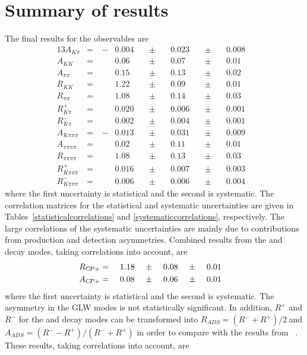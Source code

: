 \section{Summary of results}
\label{sec:cpfit:summary}

The final results for the \CP observables are  
\begin{alignat*}{13}
A_{K\pi} &= &\ -&0.004&\ &\pm&\ &0.023&\ &\pm&\ &0.008& \\
A_{KK} &= &&0.06&\ &\pm&\ &0.07&\ &\pm&\ &0.01& \\
A_{\pi\pi} &= &&0.15&\ &\pm&\ &0.13&\ &\pm&\ &0.02& \\
R_{KK} &= &&1.22&\ &\pm&\ &0.09&\ &\pm&\ &0.01& \\
R_{\pi\pi} &= &&1.08&\ &\pm&\ &0.14&\ &\pm&\ &0.03& \\
R^+_{K\pi} &= &&0.020&\ &\pm&\ &0.006&\ &\pm&\ &0.001& \\ 
R^-_{K\pi} &= &&0.002&\ &\pm&\ &0.004&\ &\pm&\ &0.001& \\
A_{K\pi\pi\pi} &= &\ -&0.013&\ &\pm&\ &0.031&\ &\pm&\ &0.009& \\
A_{\pi\pi\pi\pi} &= &&0.02&\ &\pm&\ &0.11&\ &\pm&\ &0.01& \\
R_{\pi\pi\pi\pi} &= &&1.08&\ &\pm&\ &0.13&\ &\pm&\ &0.03& \\
R^+_{K\pi\pi\pi} &= &&0.016&\ &\pm&\ &0.007&\ &\pm&\ &0.003& \\ 
R^-_{K\pi\pi\pi} &= &&0.006&\ &\pm&\ &0.006&\ &\pm&\ &0.004&
\end{alignat*}
where the first uncertainty is statistical and the second is systematic. The correlation matrices for the statistical and systematic uncertainties are given in Tables~\ref{statisticalcorrelations} and \ref{systematiccorrelations}, respectively. The large correlations of the systematic uncertainties are mainly due to contributions from production and detection asymmetries. Combined results from the \Kp\Km and \pip\pim decay modes, taking correlations into account, are
\begin{alignat*}{13}
R_{\CP+} &= &\ &1.18&\ &\pm&\ &0.08&\ &\pm&\ &0.01& \\
A_{\CP+} &= &\ &0.08&\ &\pm&\ &0.06&\ &\pm&\ &0.01&
\end{alignat*}
where the first uncertainty is statistical and the second is systematic. The asymmetry in the GLW modes is not statistically significant. In addition, $R^+$ and $R^-$ for the \pik and \pikpipi decay modes can be transformed into $R_{ADS} = \left(R^- + R^+\right)/2\ $and \mbox{$A_{ADS} = \left(R^- - R^+\right)/\left(R^- + R^+\right)$} in order to compare with the results from \babar~\cite{BaBarDKstar}. These results, taking correlations into account, are
